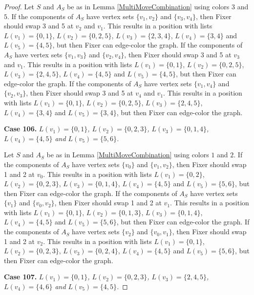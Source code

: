 \documentclass[12pt]{amsart}
\theoremstyle{plain}
\theoremstyle{definition}
\theoremstyle{remark}
\begin{document}
\begin{proof}
Let $S$ and $A_S$ be as in Lemma \ref{MultiMoveCombination} using colors $3$ and $5$. If the components of $A_S$ have vertex sets $\{v_1, v_2\}$ and $\{v_3, v_4\}$, then Fixer should swap 3 and 5 at $v_2$ and $v_1$. This results in a position with lists $L(v_1) = \{0, 1\}$, $L(v_2) = \{0, 2, 5\}$, $L(v_3) = \{2, 3, 4\}$, $L(v_4) = \{3, 4\}$ and $L(v_5) = \{4, 5\}$, but then Fixer can edge-color the graph.
If the components of $A_S$ have vertex sets $\{v_1, v_3\}$ and $\{v_2, v_4\}$, then Fixer should swap 3 and 5 at $v_3$ and $v_1$. This results in a position with lists $L(v_1) = \{0, 1\}$, $L(v_2) = \{0, 2, 5\}$, $L(v_3) = \{2, 4, 5\}$, $L(v_4) = \{4, 5\}$ and $L(v_5) = \{4, 5\}$, but then Fixer can edge-color the graph.
If the components of $A_S$ have vertex sets $\{v_1, v_4\}$ and $\{v_2, v_3\}$, then Fixer should swap 3 and 5 at $v_4$ and $v_1$. This results in a position with lists $L(v_1) = \{0, 1\}$, $L(v_2) = \{0, 2, 5\}$, $L(v_3) = \{2, 4, 5\}$, $L(v_4) = \{3, 4\}$ and $L(v_5) = \{3, 4\}$, but then Fixer can edge-color the graph.

\noindent\textbf{Case 106.  }\textit{$L(v_1) = \{0, 1\}$, $L(v_2) = \{0, 2, 3\}$, $L(v_3) = \{0, 1, 4\}$, $L(v_4) = \{4, 5\}$ and $L(v_5) = \{5, 6\}$.}

Let $S$ and $A_S$ be as in Lemma \ref{MultiMoveCombination} using colors $1$ and $2$. If the components of $A_S$ have vertex sets $\{v_0\}$ and $\{v_1, v_2\}$, then Fixer should swap 1 and 2 at $v_0$. This results in a position with lists $L(v_1) = \{0, 2\}$, $L(v_2) = \{0, 2, 3\}$, $L(v_3) = \{0, 1, 4\}$, $L(v_4) = \{4, 5\}$ and $L(v_5) = \{5, 6\}$, but then Fixer can edge-color the graph.
If the components of $A_S$ have vertex sets $\{v_1\}$ and $\{v_0, v_2\}$, then Fixer should swap 1 and 2 at $v_1$. This results in a position with lists $L(v_1) = \{0, 1\}$, $L(v_2) = \{0, 1, 3\}$, $L(v_3) = \{0, 1, 4\}$, $L(v_4) = \{4, 5\}$ and $L(v_5) = \{5, 6\}$, but then Fixer can edge-color the graph.
If the components of $A_S$ have vertex sets $\{v_2\}$ and $\{v_0, v_1\}$, then Fixer should swap 1 and 2 at $v_2$. This results in a position with lists $L(v_1) = \{0, 1\}$, $L(v_2) = \{0, 2, 3\}$, $L(v_3) = \{0, 2, 4\}$, $L(v_4) = \{4, 5\}$ and $L(v_5) = \{5, 6\}$, but then Fixer can edge-color the graph.

\noindent\textbf{Case 107.  }\textit{$L(v_1) = \{0, 1\}$, $L(v_2) = \{0, 2, 3\}$, $L(v_3) = \{2, 4, 5\}$, $L(v_4) = \{4, 6\}$ and $L(v_5) = \{4, 5\}$.}


\end{proof}
\end{document}
